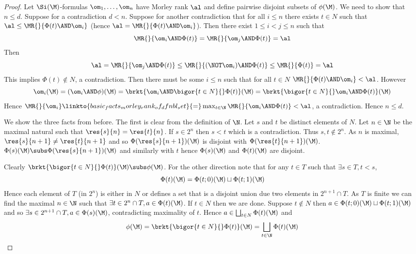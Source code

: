 \begin{proof}
    Let $\Si(\M)$-formulas 
    $\om_1,\dots,\om_n$ have Morley rank $\al$ and 
    define pairwise disjoint subsets of $\phi(\M)$.
    We need to show that $n \leq d$.
    Suppose for a contradiction $d < n$.
    Suppose for another contradiction 
    that for all $i \leq n$ there exists $t \in N$ such that 
    $\al \leq \MR{}{\Phi(t) \AND \om_i}$ 
    (hence $\al = \MR{}{\Phi(t) \AND \om_i}$).
    Then there exist $1 \leq i < j \leq n$ such that 
    \[\MR{}{\om_i \AND \Phi(t)} = \MR{}{\om_j \AND \Phi(t)} = \al\]
    Then 
    \[\al = \MR{}{\om_j \AND \Phi(t)} 
    \leq \MR{}{(\NOT \om_i) \AND \Phi(t)} \leq \MR{}{\Phi(t)} = \al\]
    This implies $\Phi(t) \notin N$, a contradiction.
    Then there must be some $i \leq n$ such that for all $t \in N$
    $\MR{}{\Phi(t) \AND \om_i} < \al$.
    However 
    \[
        \om_i(\M) = (\om_i \AND \phi)(\M) = 
        \brkt{\om_i \AND \bigor{t \in N}{} \Phi(t)}(\M)
        = \brkt{\bigor{t \in N}{} \om_i \AND \Phi(t)}(\M)
    \]
    Hence $\MR{}{\om_i} \linkto{basic_facts_morley_rank_of_dfnbl_set}{=} 
    \max_{t \in \N} \MR{}{\om_i \AND \Phi(t)} < \al$, a contradiction.
    Hence $n \leq d$.

    We show the three facts from before.
    The first is clear from the definition of $\N$.
    Let $s$ and $t$ be distinct elements of $N$. 
    Let $n \in \N$ be the maximal natural such that $\res{s}{n} = \res{t}{n}$.
    If $s \in 2^n$ then $s < t$ which is a contradiction.
    Thus $s, t \notin 2^n$.
    As $n$ is maximal, $\res{s}{n+1} \ne \res{t}{n+1}$ and so 
    $\Phi(\res{s}{n+1})(\M)$ is disjoint with $\Phi(\res{t}{n+1})(\M)$.
    $\Phi(s)(\M) \subs \Phi(\res{s}{n+1})(\M)$ and similarly with $t$ hence 
    $\Phi(s)(\M)$ and $\Phi(t)(\M)$ are disjoint.

    Clearly $\brkt{\bigor{t \in N}{} \Phi(t)}(\M) \subs \phi(\M)$.
    For the other direction note that for any $t \in T$ such that 
    $\exists s \in T, t < s$, 
    \[\Phi(t)(\M) = \Phi(t;0)(\M) \sqcup \Phi(t;1)(\M)\]
    Hence each element of $T$ (in $2^n$) 
    is either in $N$ or defines a set that is 
    a disjoint union due two elements in $2^{n+1} \cap T$.%
    As $T$ is finite we can find the maximal $n \in \N$ such that 
    $\exists t \in 2^n \cap T, a \in \Phi(t)(\M)$.
    If $t \in N$ then we are done.
    Suppose $t \notin N$ then $a \in \Phi(t;0)(\M) \sqcup \Phi(t;1)(\M)$
    and so $\exists s \in 2^{n+1} \cap T, a \in \Phi(s)(\M)$,
    contradicting maximality of $t$.
    Hence $a \in \bigsqcup_{t \in N} \Phi(t)(\M)$ and 
    \[\phi(\M) = \brkt{\bigor{t \in N}{} \Phi(t)}(\M) = 
    \bigsqcup_{t \in \N} \Phi(t)(\M)\]
\end{proof}

